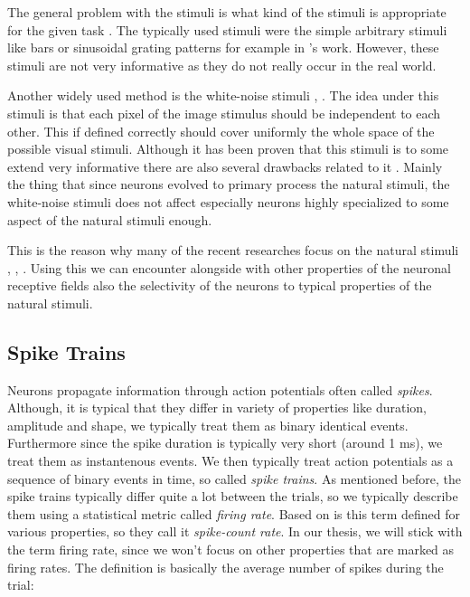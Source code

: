 The general problem with the stimuli is what kind of the stimuli is appropriate 
for the given task \citet{Carandini10577}. The typically used stimuli were the 
simple arbitrary stimuli like bars or sinusoidal grating patterns for example in 
\citet{hubel1965receptive}'s work. However, these
stimuli are not very informative as they do not really occur in the real world.

Another widely used method is the white-noise stimuli \citet{dayan2005theoretical},
\citet{chichilnisky2001simple}. The idea under this stimuli is 
that each pixel of the image stimulus should be independent to each other. This 
if defined correctly should cover uniformly the whole space of the possible visual 
stimuli. Although it has been proven that this stimuli is to some extend very 
informative there are also several drawbacks related to it \citet{Talebi1560}. 
Mainly the thing that since neurons evolved to primary process the natural stimuli, 
the white-noise stimuli does not affect especially neurons highly specialized to 
some aspect of the natural stimuli enough. 

This is the reason why many of the recent 
researches focus on the natural stimuli \citet{sonkusare2019naturalistic}, 
\citet{lurz2020generalization}, \citet{antolik2024comprehensive}. Using this we can 
encounter alongside with other properties of the neuronal receptive fields also the 
selectivity of the neurons to typical properties of the natural stimuli.

\subsection{Spike Trains}
\label{subsec:spike_trains}
Neurons propagate information through action potentials often called \emph{spikes}. 
Although, it is typical that they differ in variety of properties like duration, 
amplitude and shape, we typically 
treat them as binary identical events. Furthermore since the spike duration
is typically very short (around 1 ms), we treat them as instantenous events. We then
typically treat action potentials as a sequence of binary events in time, so called
\emph{spike trains}. As mentioned before, the spike trains typically differ quite 
a lot between the trials, so we typically describe them using a statistical metric 
called \emph{firing rate}. Based on \citet{dayan2005theoretical} is this term defined
for various properties, so they call it \emph{spike-count rate}. In our thesis, we 
will stick with the term firing rate, since we won't focus on other properties 
that are marked as firing rates. The definition is basically the average number of 
spikes during the trial:

